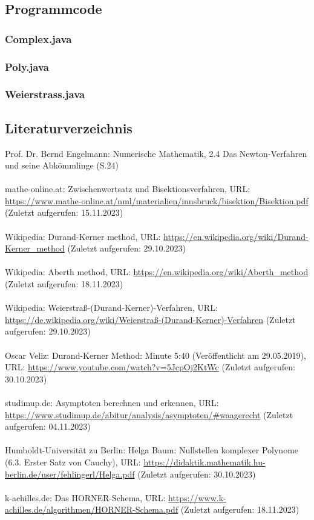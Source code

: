 \documentclass[12pt]{article}
\begin{document}
\subsection{Programmcode}
\subsubsection{Complex.java}

\subsubsection{Poly.java}

\subsubsection{Weierstrass.java}



\subsection{Literaturverzeichnis}
Prof. Dr. Bernd Engelmann: Numerische Mathematik, 2.4 Das Newton-Verfahren und seine Abkömmlinge (S.24)\\
\\
mathe-online.at: Zwischenwertsatz und Bisektionsverfahren, URL: \url{https://www.mathe-online.at/nml/materialien/innsbruck/bisektion/Bisektion.pdf} (Zuletzt aufgerufen: 15.11.2023)\\
\\
Wikipedia: Durand-Kerner method, URL: \url{https://en.wikipedia.org/wiki/Durand-Kerner_method} (Zuletzt aufgerufen: 29.10.2023)\\
\\
Wikipedia: Aberth method, URL: \url{https://en.wikipedia.org/wiki/Aberth_method} (Zuletzt aufgerufen: 18.11.2023)\\
\\
Wikipedia: Weierstraß-(Durand-Kerner)-Verfahren, URL: \url{https://de.wikipedia.org/wiki/Weierstraß-(Durand-Kerner)-Verfahren} (Zuletzt aufgerufen: 29.10.2023)\\
\\
Oscar Veliz: Durand-Kerner Method: Minute 5:40 (Veröffentlicht am 29.05.2019), URL: \url{https://www.youtube.com/watch?v=5JcpOj2KtWc} (Zuletzt aufgerufen: 30.10.2023)\\
\\
studimup.de: Asymptoten berechnen und erkennen, URL: \url{https://www.studimup.de/abitur/analysis/asymptoten/#waagerecht} (Zuletzt aufgerufen: 04.11.2023)\\
\\
Humboldt-Universität zu Berlin: Helga Baum: Nullstellen komplexer Polynome (6.3. Erster Satz von Cauchy), URL: \url{https://didaktik.mathematik.hu-berlin.de/user/fehlingerl/Helga.pdf} (Zuletzt aufgerufen: 30.10.2023)\\
\\
k-achilles.de: Das HORNER-Schema, URL: \url{https://www.k-achilles.de/algorithmen/HORNER-Schema.pdf} (Zuletzt aufgerufen: 18.11.2023)
\end{document}
